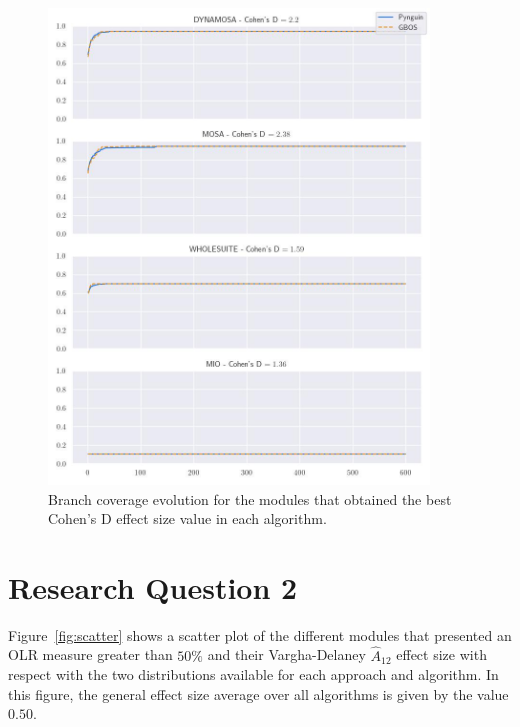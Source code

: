 \documentclass[%
  chapterprefix=false,%
  open=right,%
  twoside=true,%
  paper=a4,%
  logofile={Figures/logo.png},%
  thesistype=master,%
  UKenglish,%
]{se2thesis}
\begin{document}
\begin{figure}[ptbh]
  \centering
  \includegraphics[width=0.9\textwidth]{Figures/Results/bestES.jpg}
  \caption{Branch coverage evolution for the modules that obtained the best Cohen's D effect size value in each algorithm.}\label{fig:best}
\end{figure}

\newpage


\section{Research Question 2}

Figure~\ref{fig:scatter} shows a scatter plot of the different modules that presented an OLR measure greater than \(50\%\) and their Vargha-Delaney \(\hat{A}_{12}\) effect size with respect with the two distributions available for each approach and algorithm.
In this figure, the general effect size average over all algorithms is given by the value \(0.50\). 
\end{document}
